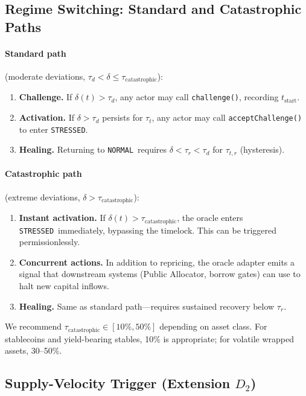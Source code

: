 \documentclass[11pt]{article}
\newcommand{\NORMAL}{\texttt{NORMAL}}
\newcommand{\STRESSED}{\texttt{STRESSED}}
\begin{document}
\subsection{Regime Switching: Standard and Catastrophic Paths}

\paragraph{Standard path} (moderate deviations, $\tau_d < \delta \le \tau_{\mathrm{catastrophic}}$):
\begin{enumerate}[leftmargin=*]
\item \textbf{Challenge.} If $\delta(t)>\tau_d$, any actor may call \texttt{challenge()}, recording $t_{\text{start}}$.
\item \textbf{Activation.} If $\delta>\tau_d$ persists for $\tau_t$, any actor may call \texttt{acceptChallenge()} to enter \STRESSED.
\item \textbf{Healing.} Returning to \NORMAL\ requires $\delta<\tau_r<\tau_d$ for $\tau_{t,r}$ (hysteresis).
\end{enumerate}

\paragraph{Catastrophic path} (extreme deviations, $\delta > \tau_{\mathrm{catastrophic}}$):
\begin{enumerate}[leftmargin=*]
\item \textbf{Instant activation.} If $\delta(t) > \tau_{\mathrm{catastrophic}}$, the oracle enters \STRESSED\ immediately, bypassing the timelock. This can be triggered permissionlessly.
\item \textbf{Concurrent actions.} In addition to repricing, the oracle adapter emits a signal that downstream systems (Public Allocator, borrow gates) can use to halt new capital inflows.
\item \textbf{Healing.} Same as standard path---requires sustained recovery below $\tau_r$.
\end{enumerate}

We recommend $\tau_{\mathrm{catastrophic}} \in [10\%, 50\%]$ depending on asset class. For stablecoins and yield-bearing stables, 10\% is appropriate; for volatile wrapped assets, 30--50\%.

\subsection{Supply-Velocity Trigger (Extension $D_2$)}
\label{sec:supply_trigger}
\end{document}
